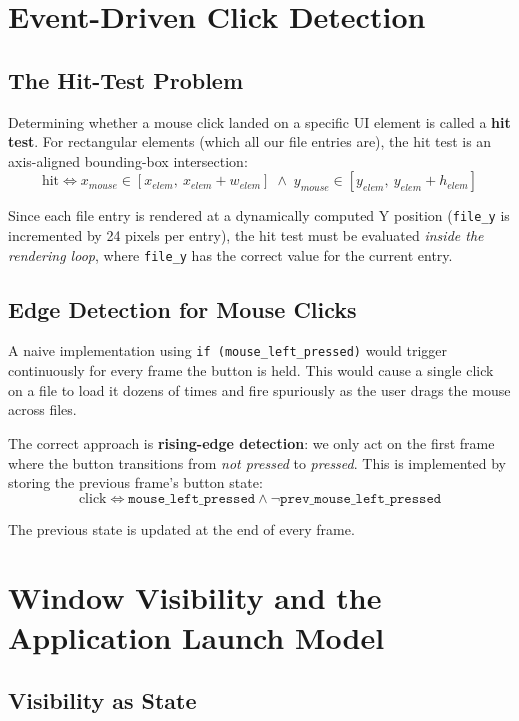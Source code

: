 \documentclass[12pt,a4paper]{report}
\begin{document}
\section{Event-Driven Click Detection}

\subsection{The Hit-Test Problem}

Determining whether a mouse click landed on a specific UI element is called a
\textbf{hit test}. For rectangular elements (which all our file entries are), the
hit test is an axis-aligned bounding-box intersection:
\[
\text{hit} \iff x_{mouse} \in [x_{elem},\ x_{elem} + w_{elem}] \;\wedge\; y_{mouse} \in [y_{elem},\ y_{elem} + h_{elem}]
\]

Since each file entry is rendered at a dynamically computed Y position
(\texttt{file\_y} is incremented by 24 pixels per entry), the hit test must be
evaluated \textit{inside the rendering loop}, where \texttt{file\_y} has the correct
value for the current entry.

\subsection{Edge Detection for Mouse Clicks}

A naive implementation using \texttt{if (mouse\_left\_pressed)} would trigger
continuously for every frame the button is held. This would cause a single click on a
file to load it dozens of times and fire spuriously as the user drags the mouse across
files.

The correct approach is \textbf{rising-edge detection}: we only act on the first frame
where the button transitions from \textit{not pressed} to \textit{pressed}. This is
implemented by storing the previous frame's button state:
\[
\text{click} \iff \texttt{mouse\_left\_pressed} \wedge \neg\texttt{prev\_mouse\_left\_pressed}
\]

The previous state is updated at the end of every frame.

\section{Window Visibility and the Application Launch Model}

\subsection{Visibility as State}
\end{document}

